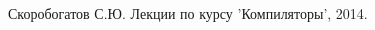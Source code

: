 \begin{thebibliography}{0}
     Скоробогатов С.Ю. Лекции по курсу 'Компиляторы', 2014.
\end{thebibliography}